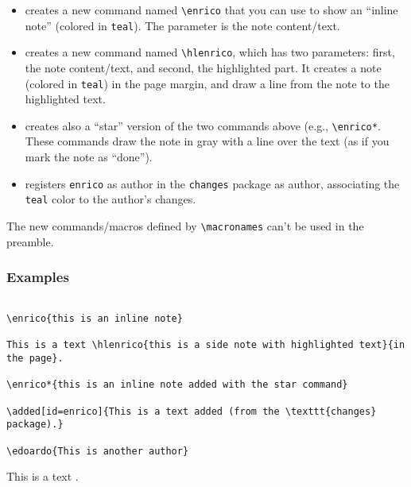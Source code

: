 \documentclass[a4paper]{article}
\newcommand\B[1]{\texttt{\textbackslash #1}}
\begin{document}
\begin{itemize}
    \item creates a new command named \B{enrico} that you can use to show an ``inline note'' (colored in \texttt{teal}). The parameter is the note content/text.
    \item creates a new command named \B{hlenrico}, which has two parameters: first, the note content/text, and second, the highlighted part. It creates a note (colored in \texttt{teal}) in the page margin, and draw a line from the note to the highlighted text.
    \item creates also a ``star'' version of the two commands above (e.g., \B{enrico*}. These commands draw the note in gray with a line over the text (as if you mark the note as ``done'').
    \item registers \texttt{enrico} as author in the \texttt{changes} package as author, associating the \texttt{teal} color to the author's changes.
\end{itemize}

The new commands/macros defined by \B{macronames} can't be used in the preamble.

\subsubsection{Examples}

\begin{verbatim}

\enrico{this is an inline note}

This is a text \hlenrico{this is a side note with highlighted text}{in the page}.

\enrico*{this is an inline note added with the star command}

\added[id=enrico]{This is a text added (from the \texttt{changes} package).}

\edoardo{This is another author}

\end{verbatim}


This is a text .



\end{document}
